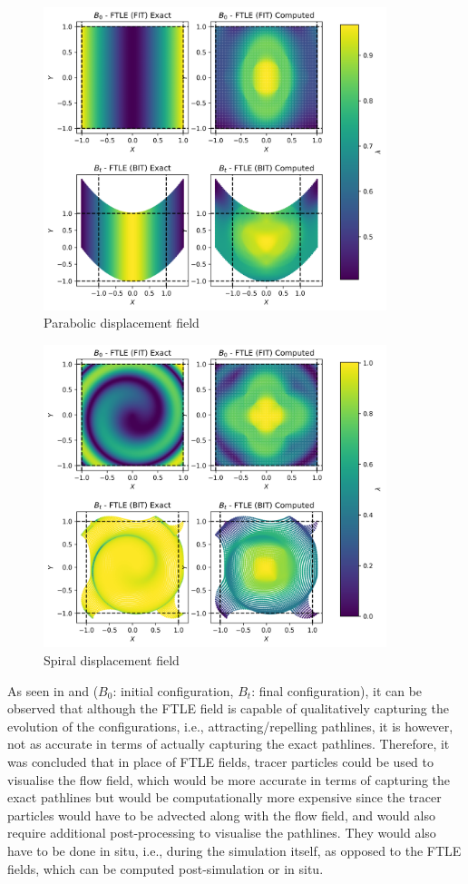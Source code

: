 \begin{figure}[htbp!]
		\centering\includegraphics[width=10cm]{Code-Figures/ftle_parabolic.png}
		\caption{Parabolic displacement field}
    \label{fig:ftle-parabolic}
\end{figure}
\begin{figure}[htbp!]
  \centering\includegraphics[width=10cm]{Code-Figures/ftle_spiral.png}
  \caption{Spiral displacement field}
  \label{fig:ftle-spiral}
\end{figure}

As seen in  and  ($B_0$: initial configuration, $B_t$: final configuration), it can be observed that although the FTLE field is capable of qualitatively capturing the evolution of the configurations, i.e., attracting/repelling pathlines, it is however, not as accurate in terms of actually capturing the exact pathlines. Therefore, it was concluded that in place of FTLE fields, tracer particles could be used to visualise the flow field, which would be more accurate in terms of capturing the exact pathlines but would be computationally more expensive since the tracer particles would have to be advected along with the flow field, and would also require additional post-processing to visualise the pathlines. They would also have to be done in situ, i.e., during the simulation itself, as opposed to the FTLE fields, which can be computed post-simulation or in situ.


